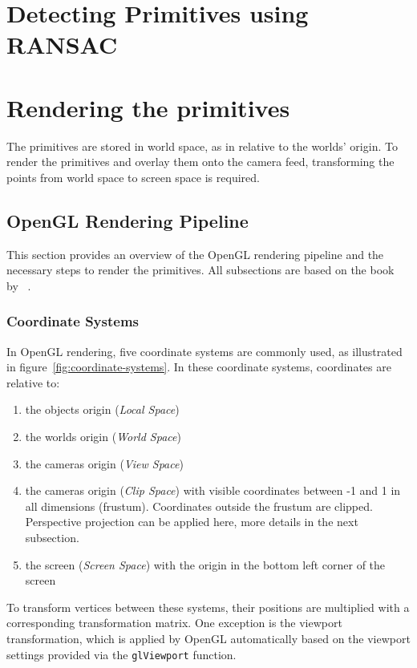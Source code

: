\section{Detecting Primitives using RANSAC}

\parencite{schnabel_efficient_2007}


\section{Rendering the primitives}\label{sec:rendering-the-primitives}
The primitives are stored in world space, as in relative to the worlds' origin.
To render the primitives and overlay them onto the camera feed,
transforming the points from world space to screen space is required.

\subsection{OpenGL Rendering Pipeline}
This section provides an overview of the OpenGL rendering pipeline and the necessary steps to render the primitives.
All subsections are based on the book~ by \citeauthor{de_vries_learn_2020}~\parencite{de_vries_learn_2020}.

\subsubsection{Coordinate Systems}\label{sec:coordinate-systems}
In OpenGL rendering, five coordinate systems are commonly used, as illustrated in figure~\ref{fig:coordinate-systems}.
In these coordinate systems, coordinates are relative to:
\begin{enumerate}
    \item the objects origin (\textit{Local Space})
    \item the worlds origin (\textit{World Space})
    \item the cameras origin (\textit{View Space})
    \item the cameras origin (\textit{Clip Space}) with visible coordinates between -1 and 1 in all dimensions (frustum).
    Coordinates outside the frustum are clipped.
    Perspective projection can be applied here, more details in the next subsection.
    \item the screen (\textit{Screen Space})  with the origin in the bottom left corner of the screen
\end{enumerate}
To transform vertices between these systems, their positions are multiplied with a corresponding transformation matrix.
One exception is the viewport transformation,
which is applied by OpenGL automatically based on the viewport settings provided via the \texttt{glViewport} function.

